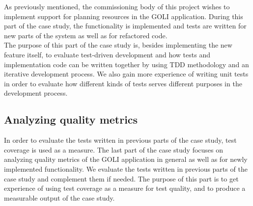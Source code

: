 As previously mentioned, the commissioning body of this project wishes to
implement support for planning resources in the GOLI application. During
this part of the case study, the functionality is implemented and tests
are written for new parts of the system as well as for refactored
code.\\

The purpose of this part of the case study is, besides implementing the
new feature itself, to evaluate test-driven development and how tests
and implementation code can be written together by using TDD methodology
and an iterative development process. We also gain more experience of
writing unit tests in order to evaluate how different kinds of tests
serves different purposes in the development process.\\


\subsection{Analyzing quality metrics}
\label{sec:casestudy_3}

In order to evaluate the tests written in previous parts of the case
study, test coverage is used as a measure. The last part of the case
study focuses on analyzing quality metrics of the GOLI application in
general as well as for newly implemented functionality. We evaluate the
tests written in previous parts of the case study and complement them if
needed. The purpose of this part is to get experience of using test
coverage as a measure for test quality, and to produce a measurable
output of the case study.\\
